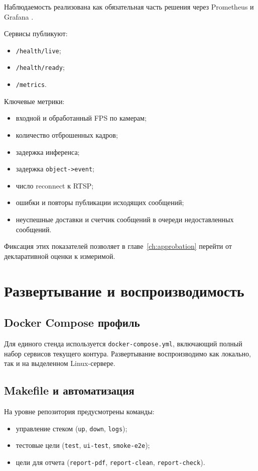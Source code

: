 Наблюдаемость реализована как обязательная часть решения через Prometheus и Grafana \cite{prometheus_docs,grafana_docs}.

Сервисы публикуют:
\begin{itemize}
    \item \texttt{/health/live};
    \item \texttt{/health/ready};
    \item \texttt{/metrics}.
\end{itemize}

Ключевые метрики:
\begin{itemize}
    \item входной и обработанный FPS по камерам;
    \item количество отброшенных кадров;
    \item задержка инференса;
    \item задержка \texttt{object->event};
    \item число reconnect к RTSP;
    \item ошибки и повторы публикации исходящих сообщений;
    \item неуспешные доставки и счетчик сообщений в очереди недоставленных сообщений.
\end{itemize}

Фиксация этих показателей позволяет в главе~\ref{ch:approbation} перейти от декларативной оценки к измеримой.

\section{Развертывание и воспроизводимость}

\subsection{Docker Compose профиль}

Для единого стенда используется \texttt{docker-compose.yml}, включающий полный набор сервисов текущего контура. Развертывание воспроизводимо как локально, так и на выделенном Linux-сервере.

\subsection{Makefile и автоматизация}

На уровне репозитория предусмотрены команды:
\begin{itemize}
    \item управление стеком (\texttt{up}, \texttt{down}, \texttt{logs});
    \item тестовые цели (\texttt{test}, \texttt{ui-test}, \texttt{smoke-e2e});
    \item цели для отчета (\texttt{report-pdf}, \texttt{report-clean}, \texttt{report-check}).
\end{itemize}


